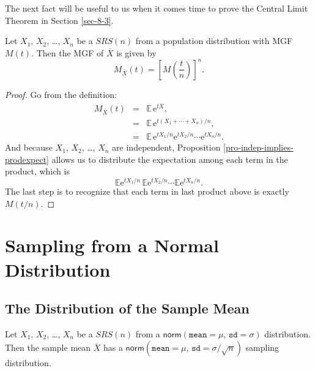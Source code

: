 The next fact will be useful to us when it comes time to prove the
Central Limit Theorem in Section \ref{sec-8-3}.

\begin{prop}
\label{pro-mgf-xbar} Let \(X_{1}\), \(X_{2}\), \ldots{}, \(X_{n}\) be a
\(SRS(n)\) from a population distribution with MGF \(M(t)\). Then the
MGF of \(\overline{X}\) is given by
\begin{equation}
M_{\overline{X}}(t)=\left[M\left(\frac{t}{n}\right)\right]^{n}.
\end{equation}
\end{prop}

\begin{proof}
Go from the definition:
\begin{eqnarray*}
M_{\overline{X}}(t) & = & \mathbb{E}\,\mathrm{e}^{t\overline{X}},\\
 & = & \mathbb{E}\,\mathrm{e}^{t(X_{1}+\cdots+X_{n})/n},\\
 & = & \mathbb{E}\,\mathrm{e}^{tX_{1}/n}\mathrm{e}^{tX_{2}/n}\cdots\mathrm{e}^{tX_{n}/n}.
\end{eqnarray*}
And because \(X_{1}\), \(X_{2}\), \ldots{}, \(X_{n}\) are independent,
Proposition \ref{pro-indep-implies-prodexpect} allows us to distribute the
expectation among each term in the product, which is \[
\mathbb{E}\mathrm{e}^{tX_{1}/n}\,\mathbb{E}\mathrm{e}^{tX_{2}/n}\cdots\mathbb{E}\mathrm{e}^{tX_{n}/n}.
\] The last step is to recognize that each term in last product above
is exactly \(M(t/n)\).
\end{proof}

\section{Sampling from a Normal Distribution}
\label{sec-8-2}

\subsection{The Distribution of the Sample Mean}
\label{sec-8-2-1}

\begin{prop}
Let \(X_{1}\), \(X_{2}\), \ldots{}, \(X_{n}\) be a \(SRS(n)\) from a
\(\mathsf{norm}(\mathtt{mean}=\mu,\,\mathtt{sd}=\sigma)\)
distribution. Then the sample mean \(\overline{X}\) has a
\(\mathsf{norm}(\mathtt{mean}=\mu,\,\mathtt{sd}=\sigma/\sqrt{n})\)
sampling distribution.
\end{prop}

